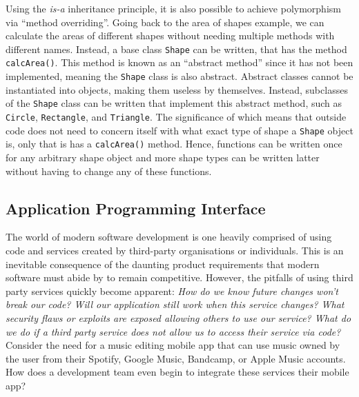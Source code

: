 \documentclass[11pt]{article}
\begin{document}
Using the \textit{is-a} inheritance principle, it is also possible to achieve polymorphism via ``method overriding''. Going back to the area of shapes example, we can calculate the areas of different shapes without needing multiple methods with different names. Instead, a base class \texttt{Shape} can be written, that has the method \texttt{calcArea()}. This method is known as an ``abstract method'' since it has not been implemented, meaning the \texttt{Shape} class is also abstract. Abstract classes cannot be instantiated into objects, making them useless by themselves. Instead, subclasses of the \texttt{Shape} class can be written that implement this abstract method, such as \texttt{Circle}, \texttt{Rectangle}, and \texttt{Triangle}. The significance of which means that outside code does not need to concern itself with what exact type of shape a \texttt{Shape} object is, only that is has a \texttt{calcArea()} method. Hence, functions can be written once for any arbitrary shape object and more shape types can be written latter without having to change any of these functions.

\subsection{Application Programming Interface}

The world of modern software development is one heavily comprised of using code and services created by third-party organisations or individuals. This is an inevitable consequence of the daunting product requirements that modern software must abide by to remain competitive. However, the pitfalls of using third party services quickly become apparent: \textit{How do we know future changes won't break our code? Will our application still work when this service changes? What security flaws or exploits are exposed allowing others to use our service? What do we do if a third party service does not allow us to access their service via code?} Consider the need for a music editing mobile app that can use music owned by the user from their Spotify, Google Music, Bandcamp, or Apple Music accounts. How does a development team even begin to integrate these services their mobile app?
\end{document}
